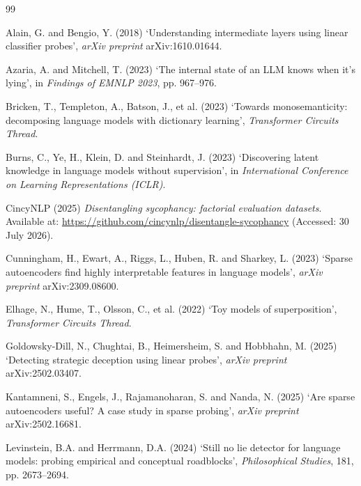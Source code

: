 \documentclass[conference]{IEEEtran}
\begin{document}
\begin{thebibliography}{99}
\setlength{\itemsep}{2pt}

Alain, G. and Bengio, Y. (2018) `Understanding intermediate layers using linear
classifier probes', \textit{arXiv preprint} arXiv:1610.01644.

Azaria, A. and Mitchell, T. (2023) `The internal state of an LLM knows when it's
lying', in \textit{Findings of EMNLP 2023}, pp. 967--976.

Bricken, T., Templeton, A., Batson, J., et al. (2023) `Towards monosemanticity:
decomposing language models with dictionary learning',
\textit{Transformer Circuits Thread}.

Burns, C., Ye, H., Klein, D. and Steinhardt, J. (2023) `Discovering latent
knowledge in language models without supervision', in \textit{International
Conference on Learning Representations (ICLR)}.

CincyNLP (2025) \textit{Disentangling sycophancy: factorial evaluation
datasets}. Available at: \url{https://github.com/cincynlp/disentangle-sycophancy}
(Accessed: 30 July 2026).

Cunningham, H., Ewart, A., Riggs, L., Huben, R. and Sharkey, L. (2023) `Sparse
autoencoders find highly interpretable features in language models',
\textit{arXiv preprint} arXiv:2309.08600.

Elhage, N., Hume, T., Olsson, C., et al. (2022) `Toy models of superposition',
\textit{Transformer Circuits Thread}.

Goldowsky-Dill, N., Chughtai, B., Heimersheim, S. and Hobbhahn, M. (2025)
`Detecting strategic deception using linear probes', \textit{arXiv preprint}
arXiv:2502.03407.

Kantamneni, S., Engels, J., Rajamanoharan, S. and Nanda, N. (2025) `Are sparse
autoencoders useful? A case study in sparse probing', \textit{arXiv preprint}
arXiv:2502.16681.

Levinstein, B.A. and Herrmann, D.A. (2024) `Still no lie detector for language
models: probing empirical and conceptual roadblocks',
\textit{Philosophical Studies}, 181, pp. 2673--2694.


\end{thebibliography}
\end{document}
